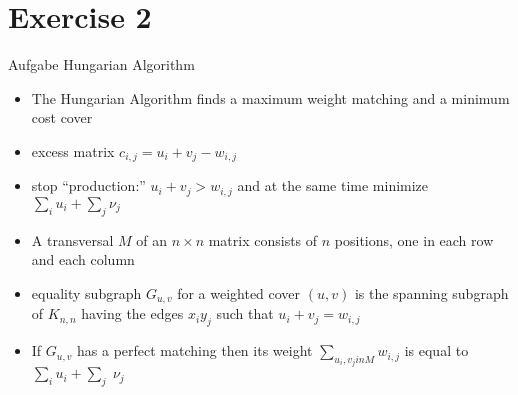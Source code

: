 
\section{Exercise 2}

\setcounter{exercise}{1}

\begin{frame}[allowframebreaks]{Aufgabe \thesection}{Hungarian Algorithm}
  \begin{requirementsnoinc}
    \begin{itemize}
      \item  The \alert{Hungarian Algorithm} finds a \alert{maximum weight matching} and a \alert{minimum cost cover}
      \item \alert{excess matrix} $c_{i,j} = u_{i }+ v_{j} - w_{i,j}$
      \item stop \enquote{production:} $u_{i}+v_{j}>w_{i,j}$ and at the same time minimize $\sum_{i}u_{i}+\sum_{j}\nu_{j}$
      \item A \alert{transversal} $M$ of an $n \times n$ matrix consists of $n$ positions, one in each row and each column
      \item \alert{equality subgraph} $G_{u,v}$ for a weighted cover $(u,v)$ is the spanning subgraph of $K_{n,n}$ having the edges $x_iy_j$ such that $u_i + v_j = w_{i,j}$
      \item  If $G_{u,v}$ has a \alert{perfect matching} then its weight $\displaystyle\sum_{u_{i},v_{j}in M}w_{i,j}$ is equal to $\displaystyle\sum_{i}u_{i}+{{\sum_{j}}}\;\nu_{j}$
    \end{itemize}

\end{requirementsnoinc}
\end{frame}
